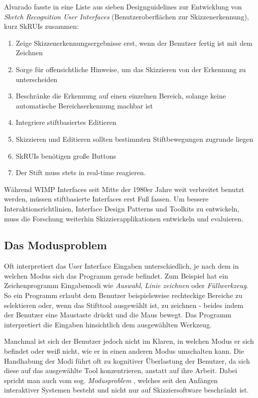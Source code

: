 Alvarado fasste in \citep{Alvorado:2004} eine Liste aus sieben Designguidelines zur Entwicklung von \emph{Sketch Recognition User Interfaces} (Benutzeroberflächen zur Skizzenerkennung), kurz SkRUIs zusammen: 

\begin{enumerate}
	\item Zeige Skizzenerkennungsergebnisse erst, wenn der Benutzer fertig ist mit dem Zeichnen
	\item Sorge für offensichtliche Hinweise, um das Skizzieren von der Erkennung zu unterscheiden
	\item Beschränke die Erkennung auf einen einzelnen Bereich, solange keine automatische Bereichserkennung machbar ist
	\item Integriere stiftbasiertes Editieren
	\item Skizzieren und Editieren sollten bestimmten Stiftbewegungen zugrunde liegen
	\item SkRUIs benötigen große Buttons
	\item Der Stift muss stets in real-time reagieren.
\end{enumerate}

Während WIMP Interfaces seit Mitte der 1980er Jahre weit verbreitet benutzt werden, müssen stiftbasierte Interfaces erst Fuß fassen. Um bessere Interaktionsrichtlinien, Interface Design Patterns und Toolkits zu entwickeln, muss die Forschung weiterhin Skizzierapplikationen entwickeln und evaluieren.

\subsection{Das Modusproblem}\label{sec:ModusProblem}  
Oft interpretiert das User Interface Eingaben unterschiedlich, je nach dem in welchen Modus sich das Programm gerade befindet. Zum Beispiel hat ein Zeichenprogramm Eingabemodi wie \emph{Auswahl}, \emph{Linie zeichnen} oder \emph{Füllwerkzeug}. So ein Programm erlaubt dem Benutzer beispielsweise rechteckige Bereiche zu selektieren oder, wenn das Stifttool ausgewählt ist, zu zeichnen - beides indem der Benutzer eine Maustaste drückt und die Maus bewegt. Das Programm interpretiert die Eingaben hinsichtlich dem ausgewählten Werkzeug. 

Manchmal ist sich der Benutzer jedoch nicht im Klaren, in welchen Modus er sich befindet oder weiß nicht, wie er in einen anderen Modus umschalten kann.  Die Handhabung der Modi führt oft zu kognitiver Überlastung der Benutzer, da sich diese auf das ausgewählte Tool konzentrieren, anstatt auf ihre Arbeit. Dabei spricht man auch vom sog. \emph{Modusproblem} \citep{Tesler:1981}, welches seit den Anfängen interaktiver Systemen besteht und nicht nur auf Skizziersoftware beschränkt ist.

